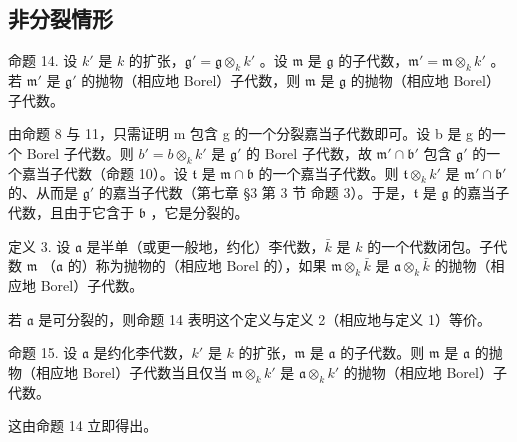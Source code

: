 \subsection{非分裂情形}

命题 14. 设 \(k'\) 是 \(k\) 的扩张，\(\mathfrak{g}' = \mathfrak{g} \otimes_k k'\) 。设 \(\mathfrak{m}\) 是 \(\mathfrak{g}\) 的子代数，\(\mathfrak{m}' = \mathfrak{m} \otimes_k k'\) 。若 \(\mathfrak{m}'\) 是 \(\mathfrak{g}'\) 的抛物（相应地 Borel）子代数，则 \(\mathfrak{m}\) 是 \(\mathfrak{g}\) 的抛物（相应地 Borel）子代数。

由命题 8 与 11，只需证明 m 包含 g 的一个分裂嘉当子代数即可。设 b 是 g 的一个 Borel 子代数。则 \(b' = b \otimes_{k} k'\) 是 \(\mathfrak{g}'\) 的 Borel 子代数，故 \(\mathfrak{m}' \cap \mathfrak{b}'\) 包含 \(\mathfrak{g}'\) 的一个嘉当子代数（命题 10）。设 \(\mathfrak{t}\) 是 \(\mathfrak{m} \cap \mathfrak{b}\) 的一个嘉当子代数。则 \(\mathfrak{t} \otimes_k k'\) 是 \(\mathfrak{m}' \cap \mathfrak{b}'\) 的、从而是 \(\mathfrak{g}'\) 的嘉当子代数（第七章 §3 第 3 节 命题 3）。于是，\(\mathfrak{t}\) 是 \(\mathfrak{g}\) 的嘉当子代数，且由于它含于 \(\mathfrak{b}\) ，它是分裂的。

定义 3. 设 \(\mathfrak{a}\) 是半单（或更一般地，约化）李代数，\(\bar{k}\) 是 \(k\) 的一个代数闭包。子代数 \(\mathfrak{m}\) （\(\mathfrak{a}\) 的）称为抛物的（相应地 Borel 的），如果 \(\mathfrak{m} \otimes_k \bar{k}\) 是 \(\mathfrak{a} \otimes_k \bar{k}\) 的抛物（相应地 Borel）子代数。

若 \(\mathfrak{a}\) 是可分裂的，则命题 14 表明这个定义与定义 2（相应地与定义 1）等价。

命题 15. 设 \(\mathfrak{a}\) 是约化李代数，\(k'\) 是 \(k\) 的扩张，\(\mathfrak{m}\) 是 \(\mathfrak{a}\) 的子代数。则 \(\mathfrak{m}\) 是 \(\mathfrak{a}\) 的抛物（相应地 Borel）子代数当且仅当 \(\mathfrak{m} \otimes_k k'\) 是 \(\mathfrak{a} \otimes_k k'\) 的抛物（相应地 Borel）子代数。

这由命题 14 立即得出。

